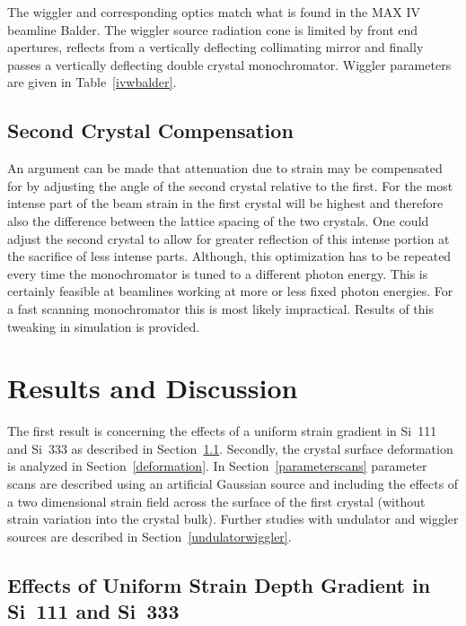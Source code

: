 \documentclass[preprint]{iucr}              %
\begin{document}
The wiggler and corresponding optics match what is found in the MAX IV beamline Balder. The wiggler source radiation cone is limited by front end apertures, reflects from a vertically deflecting collimating mirror and finally passes a vertically deflecting double crystal monochromator. Wiggler parameters are given in Table~\ref{ivwbalder}.

\subsection{Second Crystal Compensation}

An argument can be made that attenuation due to strain may be compensated for by adjusting the angle of the second crystal relative to the first. For the most intense part of the beam strain in the first crystal will be highest and therefore also the difference between the lattice spacing of the two crystals. One could adjust the second crystal to allow for greater reflection of this intense portion at the sacrifice of less intense parts. Although, this optimization has to be repeated every time the monochromator is tuned to a different photon energy. This is certainly feasible at beamlines working at more or less fixed photon energies. For a fast scanning monochromator this is most likely impractical. Results of this tweaking in simulation is provided.

\section{Results and Discussion}

The first result is concerning the effects of a uniform strain gradient in Si~111 and Si~333 as described in Section~\ref{strain_results}. Secondly, the crystal surface deformation is analyzed in Section~\ref{deformation}. In Section~\ref{parameterscans} parameter scans are described using an artificial Gaussian source and including the effects of a two dimensional strain field across the surface of the first crystal (without strain variation into the crystal bulk). Further studies with undulator and wiggler sources are described in Section~\ref{undulatorwiggler}.

\subsection{Effects of Uniform Strain Depth Gradient in Si~111 and Si~333}\label{strain_results}
\end{document}
